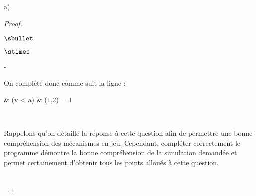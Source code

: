 \begin{liste}{a)}
\begin{proof}
\begin{noliste}{$\sbullet$}
\begin{noliste}{$\stimes$}
\begin{noliste}{-}
\begin{center}
        \end{center}          
        On complète donc comme suit la ligne  :
        \begin{scilabC}{6}
          & \qquad \qquad {} (v < a)  \nl %
          & \qquad \qquad \qquad {}(1,2) = 1 \nl %
        \end{scilabC}~\\[-1cm]
      \end{noliste}
    \end{noliste}
  \end{noliste}
  \begin{remark}%
    Rappelons qu'on détaille la réponse à cette question afin de
    permettre une bonne compréhension des mécanismes en
    jeu. Cependant, compléter correctement le programme \Scilab{}
    démontre la bonne compréhension de la simulation demandée et
    permet certainement d'obtenir tous les points alloués à cette
    question.
  \end{remark}~\\[-1.2cm]
\end{proof}
\end{liste}


\newpage

